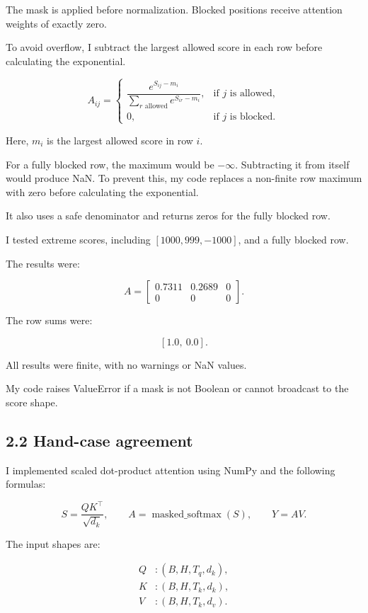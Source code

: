\documentclass[11pt]{article}
\begin{document}
The mask is applied before normalization.
Blocked positions receive attention weights of
exactly zero.

To avoid overflow, I subtract the largest allowed
score in each row before calculating the exponential.

\[
A_{ij} =
\begin{cases}
\dfrac{e^{S_{ij}-m_i}}
{\sum_{r\text{ allowed}}e^{S_{ir}-m_i}},
& \text{if }j\text{ is allowed},\\[8pt]
0, & \text{if }j\text{ is blocked}.
\end{cases}
\]

Here, $m_i$ is the largest allowed score in row $i$.

For a fully blocked row, the maximum would be
$-\infty$. Subtracting it from itself would
produce NaN. To prevent this, my code replaces
a non-finite row maximum with zero before
calculating the exponential.

It also uses a safe denominator and returns
zeros for the fully blocked row.

I tested extreme scores, including
$[1000,999,-1000]$, and a fully blocked row.

The results were:

\[
A=
\begin{bmatrix}
0.7311 & 0.2689 & 0\\
0 & 0 & 0
\end{bmatrix}.
\]

The row sums were:

\[
[1.0,\ 0.0].
\]

All results were finite, with no warnings or
NaN values.

My code raises ValueError if a mask is not
Boolean or cannot broadcast to the score shape.
\subsection*{2.2 Hand-case agreement}
I implemented scaled dot-product attention using
NumPy and the following formulas:

\[
S=\frac{QK^\top}{\sqrt{d_k}},
\qquad
A=\operatorname{masked\_softmax}(S),
\qquad
Y=AV.
\]

The input shapes are:

\[
\begin{aligned}
Q &: (B,H,T_q,d_k),\\
K &: (B,H,T_k,d_k),\\
V &: (B,H,T_k,d_v).
\end{aligned}
\]
\end{document}
